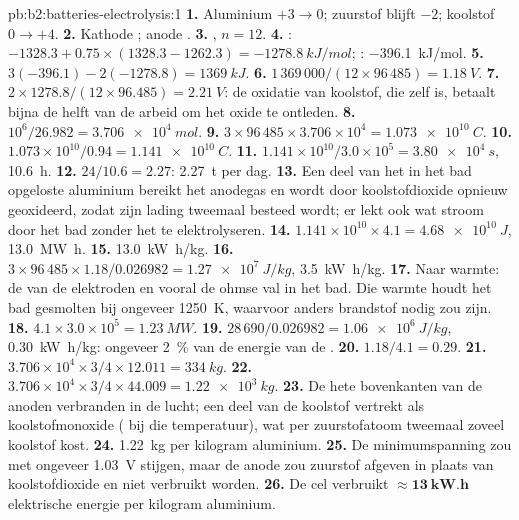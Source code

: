 \begin{solution}{pb:b2:batteries-electrolysis:1}
\textbf{1.} Aluminium $+3 \to 0$; zuurstof blijft $-2$; koolstof $0 \to +4$.
\textbf{2.} Kathode ; anode .
\textbf{3.} , $n = 12$.
\textbf{4.} : $-1328.3 + 0.75 \times (1328.3 - 1262.3) = \qty{-1278.8}{kJ/mol}$;
: \qty{-396.1}{kJ/mol}.
\textbf{5.} $3(-396.1) - 2(-1278.8) = \qty{+1369}{kJ}$.
\textbf{6.} $1\,369\,000/(12 \times 96\,485) = \qty{1.18}{V}$.
\textbf{7.} $2 \times 1278.8/(12 \times 96.485) = \qty{2.21}{V}$: de oxidatie van koolstof,
die zelf  is, betaalt bijna de helft van de arbeid om het oxide te ontleden.
\textbf{8.} $10^6/26.982 = \qty{3.706e4}{mol}$.
\textbf{9.} $3 \times 96\,485 \times 3.706 \times 10^4 = \qty{1.073e10}{C}$.
\textbf{10.} $1.073 \times 10^{10}/0.94 = \qty{1.141e10}{C}$.
\textbf{11.} $1.141 \times 10^{10}/3.0 \times 10^5 = \qty{3.80e4}{s}$, \qty{10.6}{h}.
\textbf{12.} $24/10.6 = 2.27$: \qty{2.27}{t} per dag.
\textbf{13.} Een deel van het in het bad opgeloste aluminium bereikt het anodegas en
wordt door koolstofdioxide opnieuw geoxideerd, zodat zijn lading tweemaal besteed wordt; er
lekt ook wat stroom door het bad zonder het te elektrolyseren.
\textbf{14.} $1.141 \times 10^{10} \times 4.1 = \qty{4.68e10}{J}$, \qty{13.0}{MW.h}.
\textbf{15.} \qty{13.0}{kW.h/kg}.
\textbf{16.} $3 \times 96\,485 \times 1.18/0.026982 = \qty{1.27e7}{J/kg}$, \qty{3.5}{kW.h/kg}.
\textbf{17.} Naar warmte: de  van de elektroden en vooral de
ohmse val in het bad. Die warmte houdt het bad gesmolten bij ongeveer
\qty{1250}{K}, waarvoor anders brandstof nodig zou zijn.
\textbf{18.} $4.1 \times 3.0 \times 10^5 = \qty{1.23}{MW}$.
\textbf{19.} $28\,690/0.026982 = \qty{1.06e6}{J/kg}$, \qty{0.30}{kW.h/kg}: ongeveer 2~\% van
de energie van de .
\textbf{20.} $1.18/4.1 = 0.29$.
\textbf{21.} $3.706 \times 10^4 \times 3/4 \times 12.011 = \qty{334}{kg}$.
\textbf{22.} $3.706 \times 10^4 \times 3/4 \times 44.009 = \qty{1.22e3}{kg}$.
\textbf{23.} De hete bovenkanten van de anoden verbranden in de lucht; een deel van de koolstof vertrekt
als koolstofmonoxide ( bij die temperatuur), wat per zuurstofatoom tweemaal
zoveel koolstof kost.
\textbf{24.} \qty{1.22}{kg}  per kilogram aluminium.
\textbf{25.} De minimumspanning zou met ongeveer \qty{1.03}{V} stijgen, maar de anode
zou zuurstof afgeven in plaats van koolstofdioxide en niet verbruikt worden.
\textbf{26.} De cel verbruikt $\boldsymbol{\approx \qty{13}{kW.h}}$ elektrische
energie per kilogram aluminium.
\end{solution}
